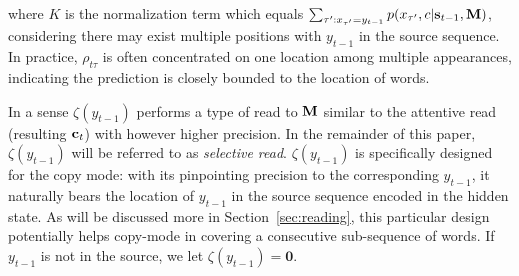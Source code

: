 where $K$ is the normalization term which equals $ \sum_{{\tau'}:x_{\tau'}=y_{t-1}} p(x_{\tau'}, c | \mathbf{s}_{t-1}, \mathbf{M})$, considering there may exist multiple positions with $y_{t-1}$ in the source sequence. In practice, $\rho_{t\tau}$ is often concentrated on one location among multiple appearances, indicating the prediction is closely bounded to the location of words.  


In a sense $\zeta(y_{t-1})$ performs a type of read to $\mathbf{M}$ similar to the attentive read (resulting $\mathbf{c}_t$) with however higher precision. In the remainder of this paper, $\zeta(y_{t-1})$ will be referred to as \emph{selective read}. $\zeta(y_{t-1})$ is specifically designed for the copy mode: with its pinpointing precision to the corresponding  $y_{t-1}$, it naturally bears the location of $y_{t-1}$ in the source sequence encoded in the hidden state. As will be discussed more in Section~\ref{sec:reading}, this particular design potentially helps copy-mode in covering a consecutive sub-sequence of words. If $y_{t-1}$ is not in the source,  we let $\zeta(y_{t-1})=\textbf{0}$. 


 

